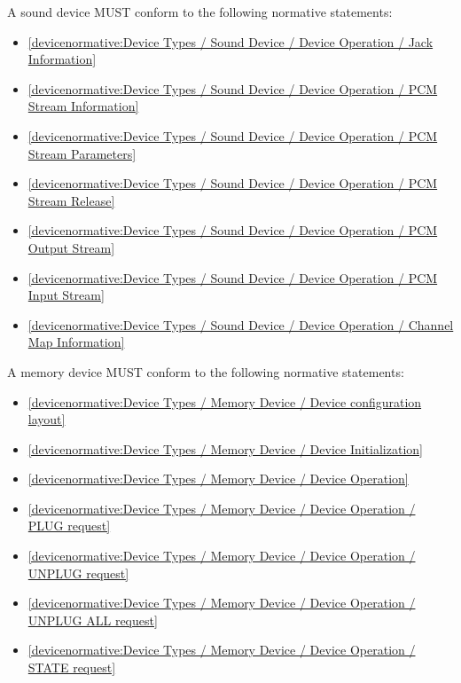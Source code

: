 \label{sec:Conformance / Device Conformance / Sound Device Conformance}

A sound device MUST conform to the following normative statements:

\begin{itemize}
\item \ref{devicenormative:Device Types / Sound Device / Device Operation / Jack Information}
\item \ref{devicenormative:Device Types / Sound Device / Device Operation / PCM Stream Information}
\item \ref{devicenormative:Device Types / Sound Device / Device Operation / PCM Stream Parameters}
\item \ref{devicenormative:Device Types / Sound Device / Device Operation / PCM Stream Release}
\item \ref{devicenormative:Device Types / Sound Device / Device Operation / PCM Output Stream}
\item \ref{devicenormative:Device Types / Sound Device / Device Operation / PCM Input Stream}
\item \ref{devicenormative:Device Types / Sound Device / Device Operation / Channel Map Information}
\end{itemize}

\label{sec:Conformance / Device Conformance / Memory Device Conformance}

A memory device MUST conform to the following normative statements:

\begin{itemize}
\item \ref{devicenormative:Device Types / Memory Device / Device configuration layout}
\item \ref{devicenormative:Device Types / Memory Device / Device Initialization}
\item \ref{devicenormative:Device Types / Memory Device / Device Operation}
\item \ref{devicenormative:Device Types / Memory Device / Device Operation / PLUG request}
\item \ref{devicenormative:Device Types / Memory Device / Device Operation / UNPLUG request}
\item \ref{devicenormative:Device Types / Memory Device / Device Operation / UNPLUG ALL request}
\item \ref{devicenormative:Device Types / Memory Device / Device Operation / STATE request}
\end{itemize}


